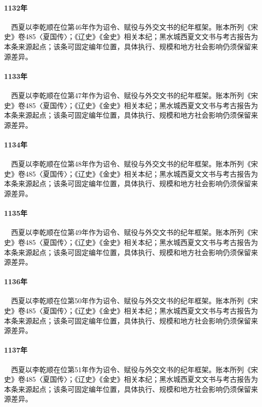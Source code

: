 \paragraph{1132年}　西夏以李乾顺在位第46年作为诏令、赋役与外交文书的纪年框架。账本所列《宋史》卷485〈夏国传〉；《辽史》《金史》相关本纪；黑水城西夏文文书与考古报告为本条来源起点；该条可固定编年位置，具体执行、规模和地方社会影响仍须保留来源差异。

\paragraph{1133年}　西夏以李乾顺在位第47年作为诏令、赋役与外交文书的纪年框架。账本所列《宋史》卷485〈夏国传〉；《辽史》《金史》相关本纪；黑水城西夏文文书与考古报告为本条来源起点；该条可固定编年位置，具体执行、规模和地方社会影响仍须保留来源差异。

\paragraph{1134年}　西夏以李乾顺在位第48年作为诏令、赋役与外交文书的纪年框架。账本所列《宋史》卷485〈夏国传〉；《辽史》《金史》相关本纪；黑水城西夏文文书与考古报告为本条来源起点；该条可固定编年位置，具体执行、规模和地方社会影响仍须保留来源差异。

\paragraph{1135年}　西夏以李乾顺在位第49年作为诏令、赋役与外交文书的纪年框架。账本所列《宋史》卷485〈夏国传〉；《辽史》《金史》相关本纪；黑水城西夏文文书与考古报告为本条来源起点；该条可固定编年位置，具体执行、规模和地方社会影响仍须保留来源差异。

\paragraph{1136年}　西夏以李乾顺在位第50年作为诏令、赋役与外交文书的纪年框架。账本所列《宋史》卷485〈夏国传〉；《辽史》《金史》相关本纪；黑水城西夏文文书与考古报告为本条来源起点；该条可固定编年位置，具体执行、规模和地方社会影响仍须保留来源差异。

\paragraph{1137年}　西夏以李乾顺在位第51年作为诏令、赋役与外交文书的纪年框架。账本所列《宋史》卷485〈夏国传〉；《辽史》《金史》相关本纪；黑水城西夏文文书与考古报告为本条来源起点；该条可固定编年位置，具体执行、规模和地方社会影响仍须保留来源差异。

